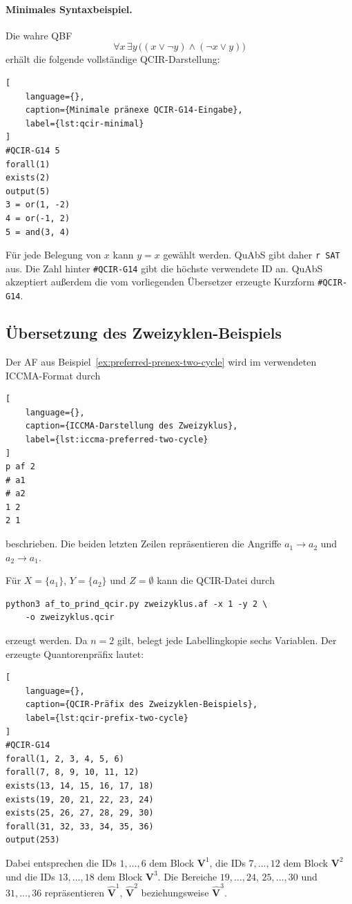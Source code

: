 \paragraph{Minimales Syntaxbeispiel.}
Die wahre QBF
\[
\forall x\,\exists y\,
\bigl((x\lor\neg y)\land(\neg x\lor y)\bigr)
\]
erhält die folgende vollständige QCIR-Darstellung:
\begin{lstlisting}[
    language={},
    caption={Minimale pränexe QCIR-G14-Eingabe},
    label={lst:qcir-minimal}
]
#QCIR-G14 5
forall(1)
exists(2)
output(5)
3 = or(1, -2)
4 = or(-1, 2)
5 = and(3, 4)
\end{lstlisting}
Für jede Belegung von \(x\) kann \(y=x\) gewählt werden. QuAbS gibt
daher \texttt{r SAT} aus. Die Zahl hinter \texttt{\#QCIR-G14} gibt die
höchste verwendete ID an. QuAbS akzeptiert außerdem die vom
vorliegenden Übersetzer erzeugte Kurzform \texttt{\#QCIR-G14}.

\subsection{Übersetzung des Zweizyklen-Beispiels}

Der AF aus Beispiel~\ref{ex:preferred-prenex-two-cycle} wird im
verwendeten ICCMA-Format durch
\begin{lstlisting}[
    language={},
    caption={ICCMA-Darstellung des Zweizyklus},
    label={lst:iccma-preferred-two-cycle}
]
p af 2
# a1
# a2
1 2
2 1
\end{lstlisting}
beschrieben. Die beiden letzten Zeilen repräsentieren die Angriffe
\(a_1\rightarrow a_2\) und \(a_2\rightarrow a_1\).

Für \(X=\{a_1\}\), \(Y=\{a_2\}\) und \(Z=\emptyset\) kann die
QCIR-Datei durch
\begin{lstlisting}[language={}]
python3 af_to_prind_qcir.py zweizyklus.af -x 1 -y 2 \
    -o zweizyklus.qcir
\end{lstlisting}
erzeugt werden. Da \(n=2\) gilt, belegt jede Labellingkopie sechs
Variablen. Der erzeugte Quantorenpräfix lautet:
\begin{lstlisting}[
    language={},
    caption={QCIR-Präfix des Zweizyklen-Beispiels},
    label={lst:qcir-prefix-two-cycle}
]
#QCIR-G14
forall(1, 2, 3, 4, 5, 6)
forall(7, 8, 9, 10, 11, 12)
exists(13, 14, 15, 16, 17, 18)
exists(19, 20, 21, 22, 23, 24)
exists(25, 26, 27, 28, 29, 30)
forall(31, 32, 33, 34, 35, 36)
output(253)
\end{lstlisting}
Dabei entsprechen die IDs \(1,\ldots,6\) dem Block
\(\mathbf V^1\), die IDs \(7,\ldots,12\) dem Block
\(\mathbf V^2\) und die IDs \(13,\ldots,18\) dem Block
\(\mathbf V^3\). Die Bereiche \(19,\ldots,24\),
\(25,\ldots,30\) und \(31,\ldots,36\) repräsentieren
\(\widehat{\mathbf V}^{1}\),
\(\widehat{\mathbf V}^{2}\) beziehungsweise
\(\widehat{\mathbf V}^{3}\).


